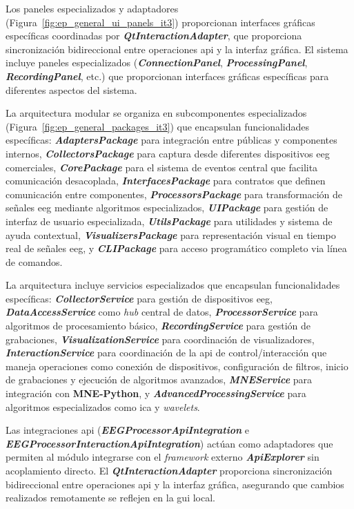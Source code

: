 Los paneles especializados y adaptadores (Figura~\ref{fig:ep_general_ui_panels_it3}) proporcionan interfaces gráficas específicas coordinadas por \textit{\textbf{QtInteractionAdapter}}, que proporciona sincronización bidireccional entre operaciones \acrshort{api} y la interfaz gráfica. El sistema incluye paneles especializados (\textit{\textbf{ConnectionPanel}}, \textit{\textbf{ProcessingPanel}}, \textit{\textbf{RecordingPanel}}, etc.) que proporcionan interfaces gráficas específicas para diferentes aspectos del sistema.

La arquitectura modular se organiza en subcomponentes especializados (Figura~\ref{fig:ep_general_packages_it3}) que encapsulan funcionalidades específicas: \textit{\textbf{AdaptersPackage}} para integración entre  públicas y componentes internos, \textit{\textbf{CollectorsPackage}} para captura desde diferentes dispositivos \acrshort{eeg} comerciales, \textit{\textbf{CorePackage}} para el sistema de eventos central que facilita comunicación desacoplada, \textit{\textbf{InterfacesPackage}} para contratos que definen comunicación entre componentes, \textit{\textbf{ProcessorsPackage}} para transformación de señales \acrshort{eeg} mediante algoritmos especializados, \textit{\textbf{UIPackage}} para gestión de interfaz de usuario especializada, \textit{\textbf{UtilsPackage}} para utilidades y sistema de ayuda contextual, \textit{\textbf{VisualizersPackage}} para representación visual en tiempo real de señales \acrshort{eeg}, y \textit{\textbf{CLIPackage}} para acceso programático completo via línea de comandos.

La arquitectura incluye servicios especializados que encapsulan funcionalidades específicas: \textit{\textbf{CollectorService}} para gestión de dispositivos \acrshort{eeg}, \textit{\textbf{DataAccessService}} como \textit{hub} central de datos, \textit{\textbf{ProcessorService}} para algoritmos de procesamiento básico, \textit{\textbf{RecordingService}} para gestión de grabaciones, \textit{\textbf{VisualizationService}} para coordinación de visualizadores, \textit{\textbf{InteractionService}} para coordinación de la \acrshort{api} de control/interacción que maneja operaciones como conexión de dispositivos, configuración de filtros, inicio de grabaciones y ejecución de algoritmos avanzados, \textit{\textbf{MNEService}} para integración con \textbf{MNE-Python}, y \textit{\textbf{AdvancedProcessingService}} para algoritmos especializados como \acrshort{ica} y \textit{\glspl{wavelet}}.

Las integraciones \acrshort{api} (\textit{\textbf{EEGProcessorApiIntegration}} e \textit{\textbf{EEGProcessorInteractionApiIntegration}}) actúan como adaptadores que permiten al módulo integrarse con el \textit{\gls{framework}} externo \textit{\textbf{ApiExplorer}} sin acoplamiento directo. El \textit{\textbf{QtInteractionAdapter}} proporciona sincronización bidireccional entre operaciones \acrshort{api} y la interfaz gráfica, asegurando que cambios realizados remotamente se reflejen en la \acrshort{gui} local.

